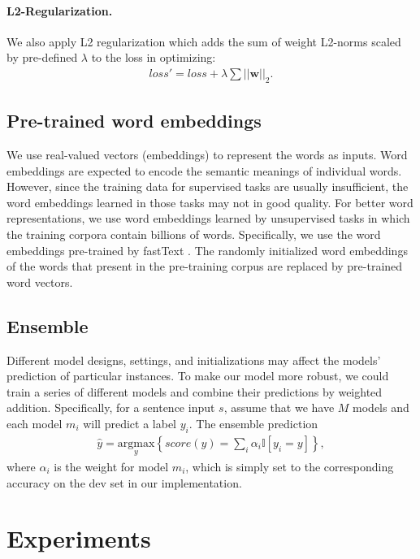 \documentclass[11pt,letterpaper]{article}
\begin{document}
    \paragraph{L2-Regularization.} We also apply L2 regularization which adds 
    the sum of weight L2-norms scaled by pre-defined $\lambda$ to the loss in 
    optimizing:
    \begin{align}
        loss' = loss + \lambda\sum||\mathbf{w}||_2.
    \end{align}

\subsection{Pre-trained word embeddings}
    We use real-valued vectors (embeddings) to represent the words as inputs. 
    Word embeddings are expected to encode the semantic meanings of individual 
    words. However, since the training data for supervised tasks are usually 
    insufficient, the word embeddings learned in those tasks may not in good
    quality. For better word representations, we use word embeddings learned by 
    unsupervised tasks in which the training corpora contain billions of words.
    Specifically, we use the word embeddings pre-trained by fastText 
    \cite{mikolov2018advances}. The randomly initialized word embeddings of the 
    words that present in the pre-training corpus are replaced by pre-trained
    word vectors.

\subsection{Ensemble}
    Different model designs, settings, and initializations may affect the
    models' prediction of particular instances. To make our model more robust, 
    we could train a series of different models and combine their predictions
    by weighted addition. Specifically, for a sentence input $s$, assume that
    we have $M$ models and each model $m_i$ will predict a label $y_i$. The 
    ensemble prediction 
    \begin{align}
        \hat{y} = \underset{y}{\mathrm{argmax}}\left\{score(y)=\sum_i\alpha_i\mathbb{I}[y_i=y]\right\},
    \end{align}
    where $\alpha_i$ is the weight for model $m_i$, which is simply set to the 
    corresponding accuracy on the dev set in our implementation.

\section{Experiments}
\end{document}
